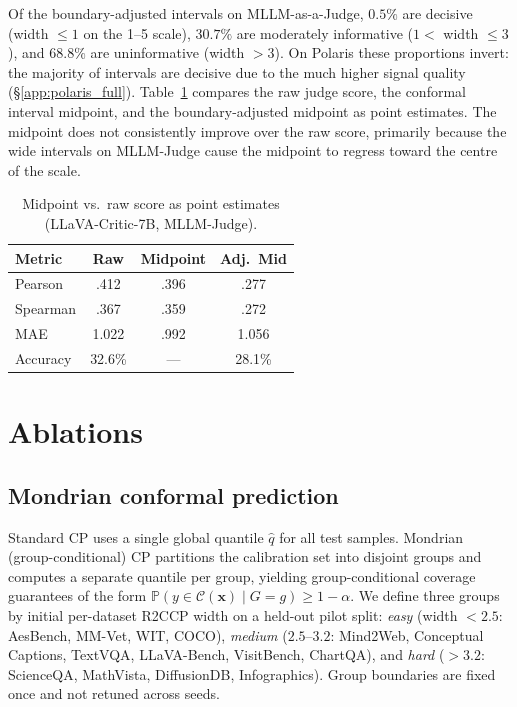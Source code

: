 \documentclass{article}
\begin{document}
Of the boundary-adjusted intervals on MLLM-as-a-Judge, $0.5\%$ are decisive (width $\leq 1$ on the 1--5 scale), $30.7\%$ are moderately informative ($1 <$ width $\leq 3$), and $68.8\%$ are uninformative (width $> 3$). On Polaris these proportions invert: the majority of intervals are decisive due to the much higher signal quality (\S\ref{app:polaris_full}). Table~\ref{tab:midpoint} compares the raw judge score, the conformal interval midpoint, and the boundary-adjusted midpoint as point estimates. The midpoint does not consistently improve over the raw score, primarily because the wide intervals on MLLM-Judge cause the midpoint to regress toward the centre of the scale.

\begin{table}[t]
\centering
\caption{Midpoint vs.\ raw score as point estimates (LLaVA-Critic-7B, MLLM-Judge).}
\label{tab:midpoint}
\small
\begin{tabular}{lccc}
\toprule
\textbf{Metric} & \textbf{Raw} & \textbf{Midpoint} & \textbf{Adj.\ Mid} \\
\midrule
Pearson & .412 & .396 & .277 \\
Spearman & .367 & .359 & .272 \\
MAE & 1.022 & .992 & 1.056 \\
Accuracy & 32.6\% & --- & 28.1\% \\
\bottomrule
\end{tabular}
\end{table}

\section{Ablations}
\label{app:ablations_full}

\subsection{Mondrian conformal prediction}
\label{app:mondrian}

Standard CP uses a single global quantile $\hat{q}$ for all test samples. Mondrian (group-conditional) CP partitions the calibration set into disjoint groups and computes a separate quantile per group, yielding group-conditional coverage guarantees of the form $\mathbb{P}(y \in \mathcal{C}(\mathbf{x}) \mid G = g) \geq 1 - \alpha$. We define three groups by initial per-dataset R2CCP width on a held-out pilot split: \emph{easy} (width $< 2.5$: AesBench, MM-Vet, WIT, COCO), \emph{medium} ($2.5$--$3.2$: Mind2Web, Conceptual Captions, TextVQA, LLaVA-Bench, VisitBench, ChartQA), and \emph{hard} ($> 3.2$: ScienceQA, MathVista, DiffusionDB, Infographics). Group boundaries are fixed once and not retuned across seeds.
\end{document}
